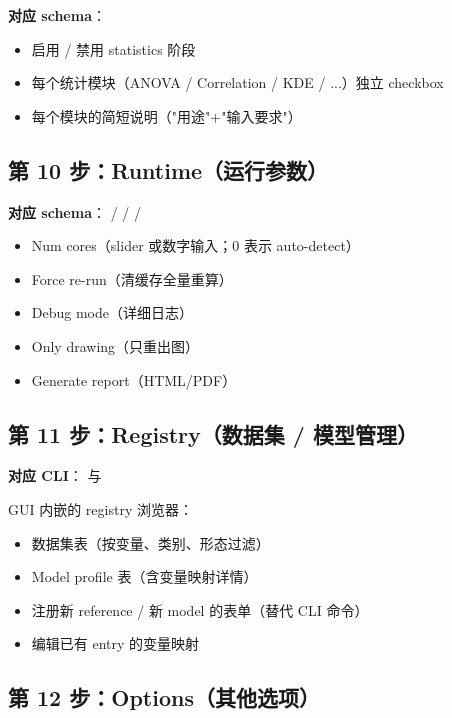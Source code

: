 \textbf{对应 schema}：

\begin{itemize}
  \item 启用 / 禁用 statistics 阶段
  \item 每个统计模块（ANOVA / Correlation / KDE / ...）独立 checkbox
  \item 每个模块的简短说明（"用途"+"输入要求"）
\end{itemize}

\subsection{第 10 步：Runtime（运行参数）}

\textbf{对应 schema}： /  /  / 

\begin{itemize}
  \item Num cores（slider 或数字输入；0 表示 auto-detect）
  \item Force re-run（清缓存全量重算）
  \item Debug mode（详细日志）
  \item Only drawing（只重出图）
  \item Generate report（HTML/PDF）
\end{itemize}

\subsection{第 11 步：Registry（数据集 / 模型管理）}

\textbf{对应 CLI}： 与 

GUI 内嵌的 registry 浏览器：

\begin{itemize}
  \item 数据集表（按变量、类别、形态过滤）
  \item Model profile 表（含变量映射详情）
  \item 注册新 reference / 新 model 的表单（替代 CLI  命令）
  \item 编辑已有 entry 的变量映射
\end{itemize}

\subsection{第 12 步：Options（其他选项）}


